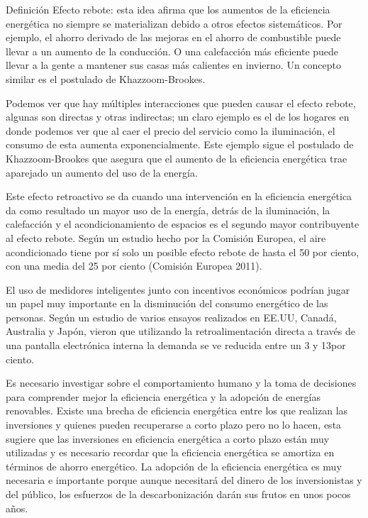 \documentclass{article}
\begin{document}
\begin{footnotesize}
\footnotesize Definición
\footnotesize Efecto rebote: esta idea afirma que los aumentos de la eficiencia energética no siempre se materializan debido a otros efectos sistemáticos. Por ejemplo, el ahorro derivado de las mejoras en el ahorro de combustible puede llevar a un aumento de la conducción. O una calefacción más eficiente puede llevar a la gente a mantener sus casas más calientes en invierno. Un concepto similar es el postulado de Khazzoom-Brookes.
\end{footnotesize}



Podemos ver que hay múltiples interacciones que pueden causar el efecto rebote, algunas son directas y otras indirectas; un claro ejemplo es el de los hogares en donde podemos ver que al caer el precio del servicio como la iluminación, el consumo de esta aumenta exponencialmente. Este ejemplo sigue el postulado de  Khazzoom-Brookes que asegura que el aumento de la eficiencia energética trae aparejado un aumento del uso de la energía.


Este efecto retroactivo se da cuando una intervención en la eficiencia energética da como resultado un mayor uso de la energía, detrás de la iluminación, la calefacción y el acondicionamiento de espacios es el segundo mayor contribuyente al efecto rebote. Según un estudio hecho por la Comisión Europea, el aire acondicionado tiene por sí solo un posible efecto rebote de hasta el 50 por ciento, con una media del 25 por ciento (Comisión Europea 2011).


El uso de medidores inteligentes junto con incentivos económicos podrían jugar un papel muy importante en la disminución del consumo energético de las personas. Según un estudio de varios ensayos realizados en EE.UU, Canadá, Australia y Japón, vieron que utilizando la retroalimentación directa a través de una pantalla electrónica interna la demanda se ve reducida entre un 3 y 13por ciento.


Es necesario investigar sobre el comportamiento humano y la toma de decisiones para comprender mejor la eficiencia energética y la adopción de energías renovables. Existe una brecha de eficiencia energética entre los que realizan las inversiones y quienes pueden recuperarse a corto plazo pero no lo hacen, esta sugiere que las inversiones en eficiencia energética a corto plazo están muy utilizadas y es necesario recordar que la eficiencia energética se amortiza en términos de ahorro energético. La adopción de la eficiencia energética es muy necesaria e importante porque aunque necesitará del dinero de los inversionistas y del público, los esfuerzos de la descarbonización darán sus frutos en unos pocos años.
\end{document}
